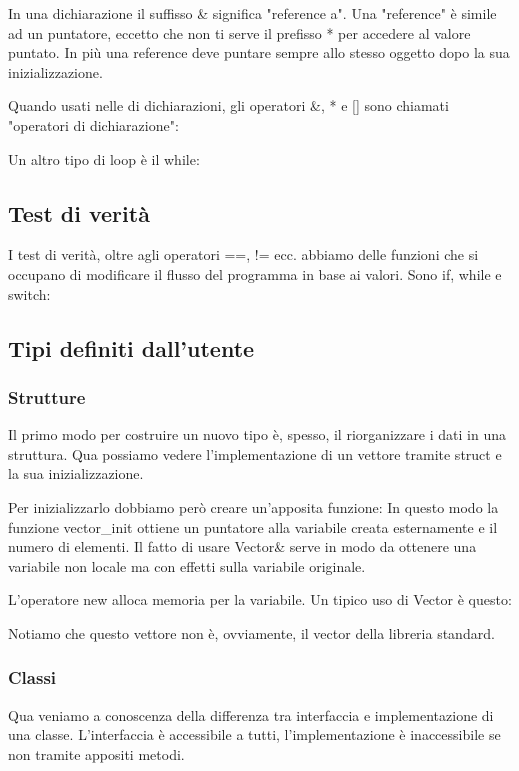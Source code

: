 \documentclass[11pt,a4paper]{book}
\begin{document}
In una dichiarazione il suffisso \& significa "reference a". Una "reference" è simile ad un puntatore, eccetto che non ti serve il prefisso * per accedere al valore puntato. In più una reference deve puntare sempre allo stesso oggetto dopo la sua inizializzazione.

Quando usati nelle di dichiarazioni, gli operatori \&, * e [] sono chiamati "operatori di dichiarazione":
\label{code: 008}

Un altro tipo di loop è il while:
\label{code: 009}

\subsection{Test di verità}
I test di verità, oltre agli operatori ==, != ecc. abbiamo delle funzioni che si occupano di modificare il flusso del programma in base ai valori. Sono if, while e switch:
\label{code: 010}
\label{code: 011}

\subsection{Tipi definiti dall'utente}
\subsubsection{Strutture}
Il primo modo per costruire un nuovo tipo è, spesso, il riorganizzare i dati in una struttura.
\label{code: 012}
Qua possiamo vedere l'implementazione di un vettore tramite struct e la sua inizializzazione.

Per inizializzarlo dobbiamo però creare un'apposita funzione:
\label{code: 013}
In questo modo la funzione vector\_init ottiene un puntatore alla variabile creata esternamente e il numero di elementi. Il fatto di usare Vector\& serve in modo da ottenere una variabile non locale ma con effetti sulla variabile originale.

L'operatore new alloca memoria per la variabile. Un tipico uso di Vector è questo:
\label{code: 014}

Notiamo che questo vettore non è, ovviamente, il vector della libreria standard.

\subsubsection{Classi}
Qua veniamo a conoscenza della differenza tra interfaccia e implementazione di una classe. L'interfaccia è accessibile a tutti, l'implementazione è inaccessibile se non tramite appositi metodi.
\end{document}
